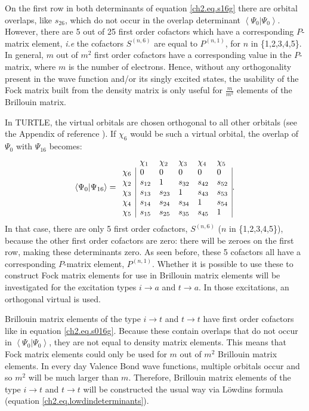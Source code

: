On the first row in both determinants of equation \ref{ch2.eq.s16g} there are orbital overlaps, like $s_{26}$, which do not occur in the overlap determinant $\left< \Psi_0 | \Psi_0 \right>$. However, there are 5 out of 25 first order cofactors which have a corresponding $P$-matrix element, \textit{i.e} the cofactors $S^{(n,6)}$ are equal to $P^{(n,1)}$, for $n$ in \{1,2,3,4,5\}. In general, $m$ out of $m^2$ first order cofactors have a corresponding value in the $P$-matrix, where $m$ is the number of electrons. Hence, without any orthogonality present in the wave function and/or its singly excited states, the usability of the Fock matrix built from the density matrix is only useful for $\frac{m}{m^2}$ elements of the Brillouin matrix. 

In TURTLE, the virtual orbitals are chosen orthogonal to all other orbitals (see the Appendix of reference \cite{koos1}). If $\chi_6$ would be such a virtual orbital, the overlap of $\Psi_0$ with $\Psi_{16}$ becomes:
\begin{equation}
\left < \Psi_0 | \Psi_{16} \right> =
\begin{array}{llllll}
 &  \chi_1 & \chi_2 & \chi_3 & \chi_4 & \chi_5 \\
 \chi_6 & \multicolumn{1}{|l}{ 0 } & 0 & 0 & 0 & \multicolumn{1}{l|}{ 0 } \\
 \chi_2 & \multicolumn{1}{|l}{ s_{12} } & 1 & s_{32} & s_{42} & \multicolumn{1}{l|}{ s_{52} } \\
 \chi_3 & \multicolumn{1}{|l}{ s_{13} } & s_{23} & 1 & s_{43} & \multicolumn{1}{l|}{ s_{53} } \\
 \chi_4 & \multicolumn{1}{|l}{ s_{14} } & s_{24} & s_{34} & 1 & \multicolumn{1}{l|}{ s_{54} } \\
 \chi_5 & \multicolumn{1}{|l}{ s_{15} } & s_{25} & s_{35} & s_{45} & \multicolumn{1}{l|}{ 1 }
\end{array}.
\label{ch2.eq.s016go}
\end{equation}
In that case, there are only 5 first order cofactors, $S^{(n,6)}$ ($n$ in \{1,2,3,4,5\}), because the other first order cofactors are zero: there will be zeroes on the first row, making these determinants zero. As seen before, these 5 cofactors all have a corresponding $P$-matrix element, $P^{(n,1)}$. Whether it is possible to use these to construct Fock matrix elements for use in Brillouin matrix elements will be investigated for the excitation types $i \rightarrow a$ and $t \rightarrow a$. In those excitations, an orthogonal virtual is used.

Brillouin matrix elements of the type $i \rightarrow t$ and $t \rightarrow t$ have first order cofactors like in equation \ref{ch2.eq.s016g}. Because these contain overlaps that do not occur in $\left< \Psi_0 | \Psi_0 \right>$, they are not equal to density matrix elements. This means that Fock matrix elements could only be used for $m$ out of $m^2$ Brillouin matrix elements. In every day Valence Bond wave functions, multiple orbitals occur and so $m^2$ will be much larger than $m$. Therefore, Brillouin matrix elements of the type $i \rightarrow t$ and $t \rightarrow t$ will be constructed the usual way via L\"{o}wdins formula (equation \ref{ch2.eq.lowdindeterminants}).


